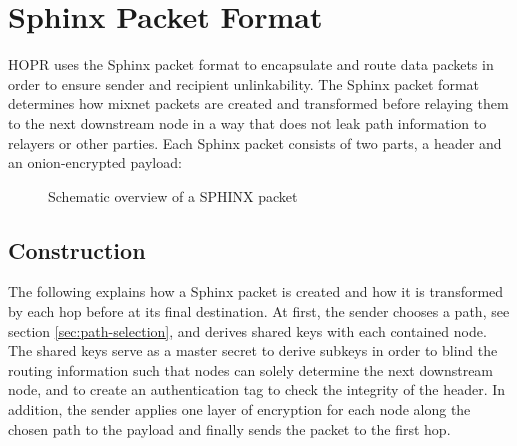 \section{Sphinx Packet Format}
\label{sec:sphinx}

HOPR uses the Sphinx packet format \cite{sphinxpaper} to encapsulate and route data packets in order to ensure sender and recipient unlinkability. The Sphinx packet format determines how mixnet packets are created and transformed before relaying them to the next downstream node in a way that does not leak path information to relayers or other parties. Each Sphinx packet consists of two parts, a header and an onion-encrypted payload:

\begin{figure}[H]
    \centering
    \label{fig:sphinxoverview}
    \caption{Schematic overview of a SPHINX packet}
\end{figure}

\subsection{Construction}

The following explains how a Sphinx packet is created and how it is transformed by each hop before at its final destination. At first, the sender chooses a path, see section \ref{sec:path-selection}, and derives shared keys with each contained node. The shared keys serve as a master secret to derive subkeys in order to blind the routing information such that nodes can solely determine the next downstream node, and to create an authentication tag to check the integrity of the header. In addition, the sender applies one layer of encryption for each node along the chosen path to the payload and finally sends the packet to the first hop.

